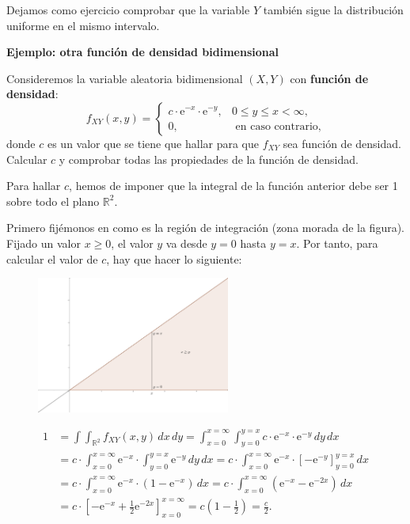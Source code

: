 \documentclass[]{book}
\begin{document}
Dejamos como ejercicio comprobar que la variable \(Y\) también sigue la distribución uniforme en el mismo intervalo.

\textbf{Ejemplo: otra función de densidad bidimensional}

Consideremos la variable aleatoria bidimensional \((X,Y)\) con \textbf{función de densidad}:
\[
f_{XY}(x,y)=\begin{cases}
c\cdot \mathrm{e}^{-x}\cdot\mathrm{e}^{-y}, & 0\leq y\leq x < \infty,\\
0, & \mbox{ en caso contrario,}
\end{cases}
\]
donde \(c\) es un valor que se tiene que hallar para que \(f_{XY}\) sea función de densidad. Calcular \(c\) y comprobar todas las propiedades de la función de densidad.

Para hallar \(c\), hemos de imponer que la integral de la función anterior debe ser 1 sobre todo el plano \(\mathbb{R}^2\).

Primero fijémonos en como es la región de integración (zona morada de la figura). Fijado un valor \(x\geq 0\), el valor \(y\) va desde \(y=0\) hasta \(y=x\). Por tanto, para calcular el valor de \(c\), hay que hacer lo siguiente:

\begin{figure}
\includegraphics[width=2.5in]{Images/Ejemplo2Bidi} \end{figure}

\[
\begin{array}{rl}
1 &=  \int\int_{\mathbb{R}^2}f_{XY}(x,y)\, dx\, dy=\int_{x=0}^{x=\infty}\int_{y=0}^{y=x} c \cdot\mathrm{e}^{-x}\cdot\mathrm{e}^{-y} \, dy\, dx \\
  &=  c\cdot \int_{x=0}^{x=\infty}\mathrm{e}^{-x}\cdot\int_{y=0}^{y=x}\mathrm{e}^{-y}\, dy\, dx = c \cdot  \int_{x=0}^{x=\infty}\mathrm{e}^{-x}\cdot\left[-\mathrm{e}^{-y}\right]_{y=0}^{y=x}\, dx \\
  &=  c \cdot\int_{x=0}^{x=\infty}\mathrm{e}^{-x}\cdot\left(1-\mathrm{e}^{-x}\right)\, dx =c \cdot\int_{x=0}^{x=\infty}\left(\mathrm{e}^{-x}-\mathrm{e}^{-2x}\right)\, dx 
  \\ & =  c \cdot\left[-\mathrm{e}^{-x}+\frac{1}{2}\mathrm{e}^{-2x}\right]_{x=0}^{x=\infty} = c\left(1-\frac{1}{2}\right)=\frac{c}{2}.
\end{array}
\]
\end{document}
